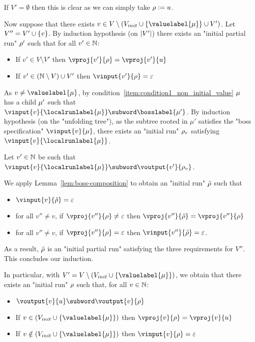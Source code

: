 	If $V' = \emptyset$ then this is clear as we can simply take $\rho := u$.
	
	Now suppose that there exists $v \in V \setminus (V_{init}\cup \set{\valuelabel{\node}} \cup V')$. Let $V'' = V' \cup \{v\}$. By induction hypothesis (on $|V'|$) there exists an "initial partial run" $\rho'$ such that for all $v' \in \mathbb{N}$:
	\begin{itemize}
		\item If $v' \in V \setminus V'$ then $\vproj{v'}{\run} = \vproj{v'}{u}$
		
		\item If $v' \in (\mathbb{N} \setminus V) \cup V'$ then $\vinput{v'}{\run} = \epsilon$
	\end{itemize}

	As $v \neq \valuelabel{\node}$, by condition~\ref{item:condition1_non_initial_value} $\mu$ has a child $\mu'$ such that $\vinput{v}{\localrunlabel{\mu}} \subword  \bosslabel{\node'}$.
	By induction hypothesis (on the "unfolding tree"), as the subtree rooted in $\mu'$ satisfies the "boss specification" $\vinput{v}{\mu}$, there exists an "initial run" $\rho_v$ satisfying $\vinput{v}{\localrunlabel{\mu}}$.
	
	Let $v' \in \mathbb{N}$ be such that $\vinput{v}{\localrunlabel{\node}} \subword \voutput{v'}{\run_v}$. 
	
	We apply Lemma~\ref{lem:boss-composition} to obtain an "initial run" $\Tilde{\rho}$ such that 
		\begin{itemize}			
		\item $\vinput{v}{\Tilde{\run}} = \varepsilon$ 
		
		\item for all $v'' \neq v$, if $\vproj{v''}{\run} \neq \varepsilon$ then $\vproj{v''}{\Tilde{\run}} = \vproj{v''}{\run}$
		
		\item for all $v'' \neq v$, if $\vproj{v''}{\run} = \varepsilon$ then $\vinput{v''}{\Tilde{\run}} = \varepsilon$.
	\end{itemize}
	
	As a result, $\Tilde{\rho}$ is an "initial partial run" satisfying the three requirements for $V''$.  This concludes our induction.
	
	In particular, with $V' = V\setminus (V_{init}\cup \set{\valuelabel{\node}})$, we obtain that there exists an "initial run" $\rho$ such that,
	for all $v \in \mathbb{N}$:
	\begin{itemize}
		\item $\voutput{v}{u} \subword \voutput{v}{\run}$
		
		\item If $v \in (V_{init}\cup \set{\valuelabel{\node}})$ then $\vproj{v}{\run} = \vproj{v}{u}$
		
		\item If $v \notin (V_{init}\cup \set{\valuelabel{\node}})$ then $\vinput{v}{\run} = \epsilon$
	\end{itemize}  
	
